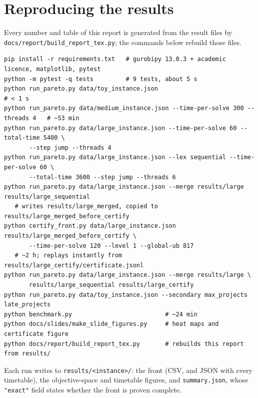 \documentclass[11pt,a4paper]{article}
\theoremstyle{plain}
\begin{document}
\appendix
\section{Reproducing the results}\label{app:repro}

Every number and table of this report is generated from the result files by \texttt{docs/report/build\_report\_tex.py}; the commands below rebuild those files.

{\small
\begin{verbatim}
pip install -r requirements.txt   # gurobipy 13.0.3 + academic licence, matplotlib, pytest
python -m pytest -q tests         # 9 tests, about 5 s
python run_pareto.py data/toy_instance.json                                       # < 1 s
python run_pareto.py data/medium_instance.json --time-per-solve 300 --threads 4   # ~53 min
python run_pareto.py data/large_instance.json --time-per-solve 60 --total-time 5400 \
       --step jump --threads 4
python run_pareto.py data/large_instance.json --lex sequential --time-per-solve 60 \
       --total-time 3600 --step jump --threads 6
python run_pareto.py data/large_instance.json --merge results/large results/large_sequential
   # writes results/large_merged, copied to results/large_merged_before_certify
python certify_front.py data/large_instance.json results/large_merged_before_certify \
       --time-per-solve 120 --level 1 --global-ub 817
   # ~2 h; replays instantly from results/large_certify/certificate.jsonl
python run_pareto.py data/large_instance.json --merge results/large \
       results/large_sequential results/large_certify
python run_pareto.py data/toy_instance.json --secondary max_projects late_projects
python benchmark.py                          # ~24 min
python docs/slides/make_slide_figures.py     # heat maps and certificate figure
python docs/report/build_report_tex.py       # rebuilds this report from results/
\end{verbatim}
}

Each run writes to \texttt{results/<instance>/}: the front (CSV, and JSON with every timetable), the objective-space and timetable figures, and \texttt{summary.json}, whose \texttt{"exact"} field states whether the front is proven complete.
\end{document}

